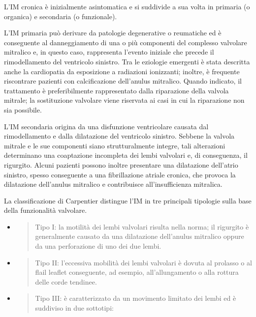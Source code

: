 \documentclass[12pt,a4paper,twoside]{article}
\begin{document}
L'IM cronica è inizialmente asintomatica e si suddivide a sua volta in primaria (o organica) e secondaria (o funzionale).

L'IM primaria può derivare da patologie degenerative o reumatiche ed è conseguente al danneggiamento di una o più componenti del complesso valvolare mitralico e, in questo caso, rappresenta l'evento iniziale che precede il rimodellamento del ventricolo sinistro. Tra le eziologie emergenti è stata descritta anche la cardiopatia da esposizione a radiazioni ionizzanti; inoltre, è frequente riscontrare pazienti con calcificazione dell'anulus mitralico. Quando indicato, il trattamento è preferibilmente rappresentato dalla riparazione della valvola mitrale; la sostituzione valvolare viene riservata ai casi in cui la riparazione non sia possibile. \cite{ref6}

L'IM secondaria origina da una disfunzione ventricolare causata dal rimodellamento e dalla dilatazione del ventricolo sinistro. Sebbene la valvola mitrale e le sue componenti siano strutturalmente integre, tali alterazioni determinano una coaptazione incompleta dei lembi valvolari e, di conseguenza, il rigurgito. Alcuni pazienti possono inoltre presentare una dilatazione dell'atrio sinistro, spesso conseguente a una fibrillazione atriale cronica, che provoca la dilatazione dell'anulus mitralico e contribuisce all'insufficienza mitralica. \cite{ref6}

La classificazione di Carpentier distingue l'IM in tre principali tipologie sulla base della funzionalità valvolare.

\begin{itemize}
\item
  \begin{quote}
  Tipo I: la motilità dei lembi valvolari risulta nella norma; il rigurgito è generalmente causato da una dilatazione dell'anulus mitralico oppure da una perforazione di uno dei due lembi.
  \end{quote}
\item
  \begin{quote}
  Tipo II: l'eccessiva mobilità dei lembi valvolari è dovuta al prolasso o al flail leaflet conseguente, ad esempio, all'allungamento o alla rottura delle corde tendinee.
  \end{quote}
\item
  \begin{quote}
  Tipo III: è caratterizzato da un movimento limitato dei lembi ed è suddiviso in due sottotipi:
  \end{quote}
\end{itemize}
\end{document}
